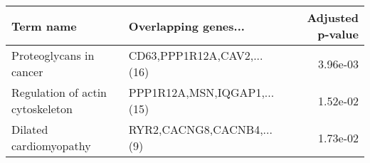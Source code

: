 \begin{tabular}{llr}
\toprule
                       Term name &        Overlapping genes... &  Adjusted p-value \\
\midrule
         Proteoglycans in cancer &  CD63,PPP1R12A,CAV2,...(16) &          3.96e-03 \\
Regulation of actin cytoskeleton & PPP1R12A,MSN,IQGAP1,...(15) &          1.52e-02 \\
          Dilated cardiomyopathy &   RYR2,CACNG8,CACNB4,...(9) &          1.73e-02 \\
\bottomrule
\end{tabular}
